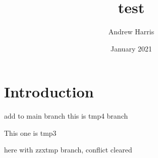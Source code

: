 \documentclass{article}
\title{test}
\author{Andrew Harris}
\date{January 2021}
\begin{document}
\maketitle

\section{Introduction}
add to main branch
this is tmp4 branch

This one is tmp3

here with zzxtmp branch, conflict cleared
\end{document}
